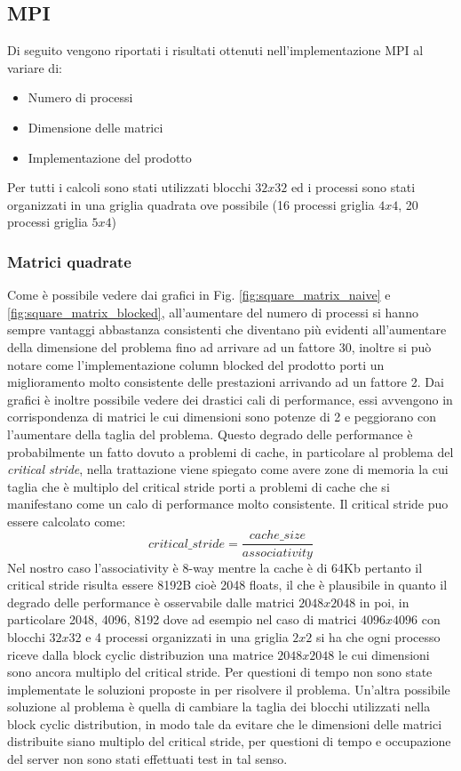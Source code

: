 \documentclass[conference]{IEEEtran}
\begin{document}
\subsection{MPI}
Di seguito vengono riportati i risultati ottenuti nell'implementazione MPI al variare di:
\begin{itemize}
    \item Numero di processi
    \item Dimensione delle matrici
    \item Implementazione del prodotto
\end{itemize}
Per tutti i calcoli sono stati utilizzati blocchi $32x32$ ed i processi sono stati organizzati in una griglia quadrata ove possibile (16 processi griglia $4x4$, 20 processi griglia $5x4$)

\subsubsection{Matrici quadrate}
Come è possibile vedere dai grafici in Fig. \ref{fig:square_matrix_naive} e \ref{fig:square_matrix_blocked}, all'aumentare del numero di processi si hanno sempre vantaggi abbastanza consistenti che diventano più evidenti all'aumentare della dimensione del problema fino ad arrivare ad un fattore 30, inoltre si può notare come l'implementazione column blocked del prodotto porti un miglioramento molto consistente delle prestazioni arrivando ad un fattore 2. Dai grafici è inoltre possibile vedere dei drastici cali di performance, essi avvengono in corrispondenza di matrici le cui dimensioni sono potenze di 2 e peggiorano con l'aumentare della taglia del problema. Questo degrado delle performance è probabilmente un fatto dovuto a problemi di cache, in particolare al problema del \textit{critical stride}\cite{b1}, nella trattazione viene spiegato come avere zone di memoria la cui taglia che è multiplo del critical stride porti a problemi di cache che si manifestano come un calo di performance molto consistente. Il critical stride puo essere calcolato come:
\begin{equation}
    critical\_stride =\frac{cache\_size}{associativity}
\end{equation}
Nel nostro caso l'associativity è 8-way mentre la cache è di 64Kb pertanto il critical stride risulta essere 8192B cioè 2048 floats, il che è plausibile in quanto il degrado delle performance è osservabile dalle matrici $2048x2048$ in poi, in particolare 2048, 4096, 8192 dove ad esempio nel caso di matrici $4096x4096$ con blocchi $32x32$ e 4 processi organizzati in una griglia $2x2$ si ha che ogni processo riceve dalla block cyclic distribuzion una matrice $2048x2048$ le cui dimensioni sono ancora multiplo del critical stride.
Per questioni di tempo non sono state implementate le soluzioni proposte in \cite{b1} per risolvere il problema. Un'altra possibile soluzione al problema è quella di cambiare la taglia dei blocchi utilizzati nella block cyclic distribution, in modo tale da evitare che le dimensioni delle matrici distribuite siano multiplo del critical stride, per questioni di tempo e occupazione del server non sono stati effettuati test in tal senso.
\end{document}
